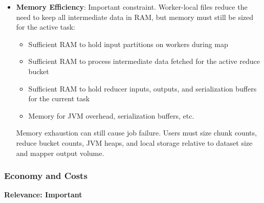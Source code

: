 \documentclass{scrartcl}
\begin{document}
\begin{itemize}
    \item \textbf{Memory Efficiency}: Important constraint. Worker-local files reduce the need to keep all intermediate data in RAM, but memory must still be sized for the active task:
          \begin{itemize}
              \item Sufficient RAM to hold input partitions on workers during map
              \item Sufficient RAM to process intermediate data fetched for the active reduce bucket
              \item Sufficient RAM to hold reducer inputs, outputs, and serialization buffers for the current task
              \item Memory for JVM overhead, serialization buffers, etc.
          \end{itemize}
          Memory exhaustion can still cause job failure. Users must size chunk counts, reduce bucket counts, JVM heaps, and local storage relative to dataset size and mapper output volume.
\end{itemize}

\subsubsection{Economy and Costs}

\textbf{Relevance: Important}
\end{document}
